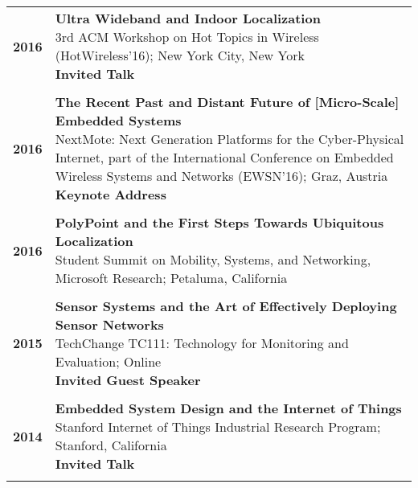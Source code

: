 \documentclass{article}
\begin{document}
\begin{longtable}{>{\bf}p{1cm} l}
  \\

  2016 & \makecell{
    \textbf{Ultra Wideband and Indoor Localization} \\
    3rd ACM Workshop on Hot Topics in Wireless (HotWireless'16); New York City, New York \\
    \textbf{\color{BrickRed} Invited Talk}
  } \\

  \\

  2016 & \makecell{
    \textbf{The Recent Past and Distant Future of [Micro-Scale] Embedded Systems} \\
    NextMote: Next Generation Platforms for the Cyber-Physical Internet, part of the International Conference on Embedded Wireless Systems and Networks (EWSN'16); Graz, Austria \\
    \textbf{\color{BrickRed} Keynote Address} \\
  } \\

  \\

  2016 & \makecell{
    \textbf{PolyPoint and the First Steps Towards Ubiquitous Localization} \\
    Student Summit on Mobility, Systems, and Networking, Microsoft Research; Petaluma, California \\
  } \\

  \\

  2015 & \makecell{
    \textbf{Sensor Systems and the Art of Effectively Deploying Sensor Networks} \\
    TechChange TC111: Technology for Monitoring and Evaluation; Online \\
    \textbf{\color{BrickRed} Invited Guest Speaker} \\
  } \\

  \\

  2014 & \makecell{
    \textbf{Embedded System Design and the Internet of Things} \\
    Stanford Internet of Things Industrial Research Program; Stanford, California \\
    \textbf{\color{BrickRed} Invited Talk} \\
  } \\

  \\


\end{longtable}
\end{document}
